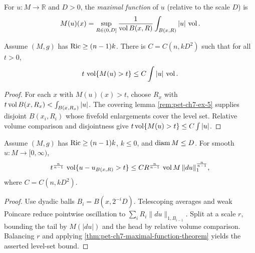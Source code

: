 \begin{definition}
  \label{def:pet-ch7-maximal-function}

  For $u:M\to\mathbb{R}$ and $D>0$, the \emph{maximal function} of $u$ (relative to
  the scale $D$) is
  \[
    M(u)(x)=\sup_{R\in(0,D]}\frac{1}{\operatorname{vol} B(x,R)}\int_{B(x,R)}|u|\,\operatorname{vol}.
  \]
\end{definition}

\begin{theorem}
  \label{thm:pet-ch7-maximal-function-theorem}

  Assume $(M,g)$ has $\operatorname{Ric}\ge(n-1)k$. There is $C=C(n,kD^2)$ such that for all
  $t>0$,
  \[
    t\,\operatorname{vol}\{M(u)>t\}\le C\int|u|\,\operatorname{vol}.
  \]
\end{theorem}
\begin{proof}
  \sketch
  For each \(x\) with \(M(u)(x)>t\), choose \(R_x\) with \(t\operatorname{vol} B(x,R_x)<\int_{B(x,R_x)}|u|\). The covering lemma \cref{rem:pet-ch7-ex-5} supplies disjoint \(B(x_i,R_i)\) whose fivefold enlargements cover the level set. Relative volume comparison and disjointness give \(t\operatorname{vol}\{M(u)>t\}\le C\int|u|\).
\end{proof}

\begin{theorem}
  \label{thm:pet-ch7-weak-poincare-sobolev-estimate}

  Assume $(M,g)$ has $\operatorname{Ric}\ge(n-1)k$, $k\le0$, and $\operatorname{diam} M\le D$. For smooth
  $u:M\to[0,\infty)$,
  \[
    t^{\frac{n}{n-1}}\,\operatorname{vol}\{u-u_{B(x,R)}>t\}
    \le C R^{\frac{n}{n-1}}\,\operatorname{vol} M\,\|du\|_1^{\frac{n}{n-1}},
  \]
  where $C=C(n,kD^2)$.
\end{theorem}
\begin{proof}
  \sketch
  Use dyadic balls \(B_i=B(x,2^{-i}D)\). Telescoping averages and weak Poincare reduce pointwise oscillation to \(\sum_iR_i\|du\|_{1,B_{i-1}}\). Split at a scale \(r\), bounding the tail by \(M(|du|)\) and the head by relative volume comparison. Balancing \(r\) and applying \cref{thm:pet-ch7-maximal-function-theorem} yields the asserted level-set bound.
\end{proof}

